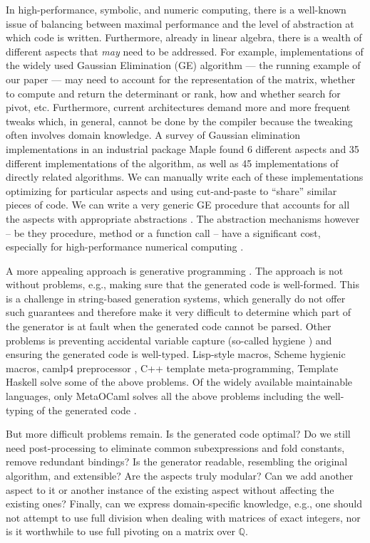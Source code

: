 \documentclass{llncs}
\begin{document}
In high-performance, symbolic, and numeric computing, there is a
well-known issue of balancing between maximal performance and the
level of abstraction at which code is written.  Furthermore, already
in linear algebra, there is a wealth of different aspects that
\emph{may} need to be addressed. For example, implementations of the
widely used Gaussian Elimination (GE) algorithm --- the running
example of our paper --- may need to account for the representation of
the matrix, whether to compute and return the determinant or rank, how
and whether search for pivot, etc. Furthermore, current architectures
demand more and more frequent tweaks which, in general, cannot be done by the
compiler because the tweaking often involves domain knowledge. 
A survey \cite{carette04} of
Gaussian elimination implementations in an industrial package Maple
found 6 different aspects and 35 different implementations of the
algorithm, as well as 45 implementations of directly related
algorithms.  We can manually write each of these implementations
optimizing for particular aspects and using cut-and-paste to ``share''
similar pieces of code.
We can write a very generic GE procedure that accounts for
all the aspects with appropriate abstractions \cite{Axiom}. The
abstraction mechanisms however -- be they procedure, method or a
function call -- have a significant cost, especially for
high-performance numerical computing \cite{carette04}. 

A more appealing approach is generative programming
\cite{Czarnecki,Veldhuizen:1998:ISCOPE,musser94algorithmoriented,BOOST,POOMA,ATLAS}.
The approach is not without problems, e.g., making sure that the
generated code is well-formed. This is a challenge in string-based
generation systems, which generally do not offer such guarantees and
therefore make it very difficult to determine which part of the
generator is at fault when the generated code cannot be parsed. Other
problems is preventing accidental variable capture (so-called hygiene
\cite{HygienicMacros}) and ensuring the generated code is
well-typed. Lisp-style macros, Scheme hygienic macros, camlp4
preprocessor \cite{camlp4}, C++ template meta-programming, Template
Haskell \cite{conf/dagstuhl/CzarneckiOST03} solve some of the above
problems. Of the widely available maintainable languages, only
MetaOCaml \cite{CTHL03,metaocaml-org}  solves all the above problems
including the well-typing of the generated code \cite{TahaSheard97,TahaThesis}.

But more difficult problems remain. Is the generated code optimal? Do
we still need post-processing to eliminate common subexpressions and
fold constants, remove redundant bindings? Is the generator readable,
resembling the original algorithm, and extensible? Are the aspects
truly modular? Can we add another aspect to it or another instance of
the existing aspect without affecting the existing ones? Finally, can
we express domain-specific knowledge, e.g., one should not attempt to
use full division when dealing with matrices of exact integers, nor is
it worthwhile to use full pivoting on a matrix over $\mathbb Q $.
\end{document}
